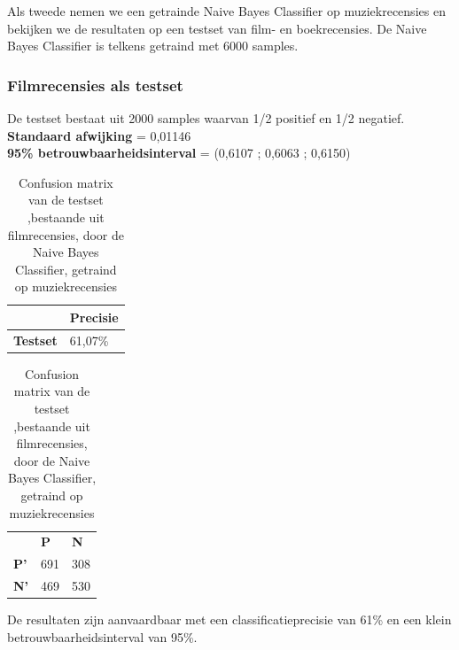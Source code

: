 \begin{appendices}
Als tweede nemen we een getrainde Naive Bayes Classifier op muziekrecensies en bekijken we de resultaten op een testset van film- en boekrecensies. De Naive Bayes Classifier is telkens getraind met 6000 samples.

\subsubsection{Filmrecensies als testset}\label{Filmrecensies als testset}

De testset bestaat uit 2000 samples waarvan 1/2 positief en 1/2 negatief.\\

\textbf{Standaard afwijking} = 0,01146\\
\textbf{95\% betrouwbaarheidsinterval} = (0,6107 ; 0,6063 ; 0,6150)
 
\begin{table}[h]
\centering
\setlength\tabcolsep{4pt}
\begin{minipage}[t]{0.48\textwidth}
\centering
\begin{tabular}{l|l|}
\cline{2-2}
                                            & \textbf{Precisie} \\ \hline
\multicolumn{1}{|l|}{\textbf{Testset}}      & 61,07\%           \\ \hline
\end{tabular}
\caption{Classificatieprecisie Naive Bayes Classifier, getraind op muziekrecensies, getest op filmrecensies}
\end{minipage}%
\hfill
\begin{minipage}[t]{0.48\textwidth}
\centering
\begin{tabular}{lll}
                                 & \textbf{P}               & \textbf{N}               \\ \cline{2-3} 
\multicolumn{1}{l|}{\textbf{P'}} & \multicolumn{1}{l|}{691} & \multicolumn{1}{l|}{308} \\ \cline{2-3} 
\multicolumn{1}{l|}{\textbf{N'}} & \multicolumn{1}{l|}{469} & \multicolumn{1}{l|}{530} \\ \cline{2-3} 
\end{tabular}
\caption{Confusion matrix van de testset ,bestaande uit filmrecensies, door de  Naive Bayes Classifier, getraind op muziekrecensies} 
\end{minipage}
\end{table}

De resultaten zijn aanvaardbaar met een classificatieprecisie van 61\% en een klein betrouwbaarheidsinterval van 95\%.


\end{appendices}
